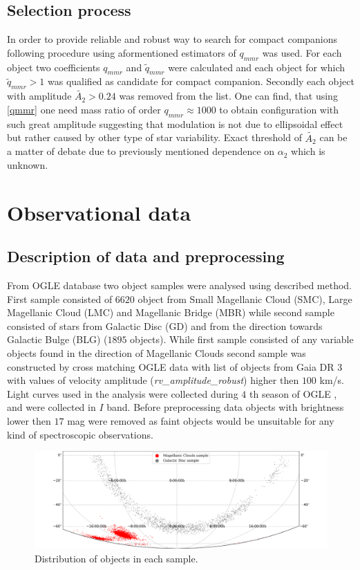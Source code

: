 \documentclass{pracalicmgr}
\begin{document}
\section{Selection process}
In order to provide reliable and robust way to search for compact companions following procedure using aformentioned estimators of $q_{mmr}$ was used.
For each object two coefficients $q_{mmr}$ and $\tilde{q}_{mmr}$ were calculated and each object for which $\tilde{q}_{mmr}>1$ was qualified as candidate for compact companion.
Secondly each object with amplitude $\tilde{A_2}>0.24$ was removed from the list. One can find, that using \ref{qmmr} one need mass ratio of order $q_{mmr}\approx 1000$
to obtain configuration with such great amplitude 
suggesting that modulation is not due to ellipsoidal effect but rather caused by other type of star variability. Exact threshold of $\tilde{A_2}$ can be a matter of debate due to 
previously mentioned dependence on $\alpha_2$ which is unknown. 

\chapter{Observational data}
\section{Description of data and preprocessing}
From OGLE database two object samples were analysed using described method. First sample consisted of $6620$ object from Small Magellanic Cloud (SMC), Large Magellanic Cloud (LMC) and 
Magellanic Bridge  (MBR) while second sample consisted of stars from Galactic Disc (GD) and from the direction towards Galactic Bulge (BLG) ($1895$ objects). While first sample consisted 
of any variable objects found in the direction of Magellanic Clouds second sample was constructed by cross matching OGLE data with list of objects from Gaia DR 3 \citep{gaia_collaboration_gaia_2022} with values of 
velocity amplitude ({\it{rv\_amplitude\_robust}}) higher then $100$ km/s. Light curves used in the analysis were collected during $4$ th season of OGLE \citep{udalski_ogle-iv_2015},
 \citep{udalski_optical_1992} and were collected in $I$ band. Before preprocessing data objects with brightness lower then
$17$ mag  were removed as faint objects would be unsuitable for any kind of spectroscopic observations.
\begin{figure}[H]
    \begin{center}
        \includegraphics[scale=0.52]{plots/map_sample.png}
    \end{center}
    \caption{Distribution of objects in each sample.}
\end{figure}
\end{document}
